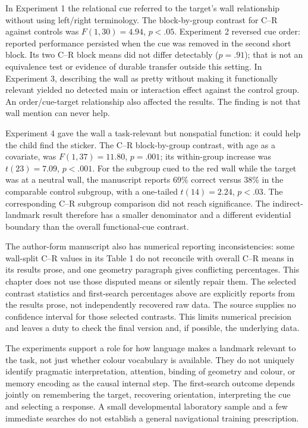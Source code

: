 In Experiment 1 the relational cue referred to the target's wall
relationship without using left/right terminology.
The block-by-group contrast for C--R against controls was
\(F(1,30)=4.94\), \(p<.05\).
Experiment 2 reversed cue order: reported performance persisted
when the cue was removed in the second short block.
Its two C--R block means did not differ detectably (\(p=.91\));
that is not an equivalence test or evidence of durable transfer
outside this setting.
In Experiment 3, describing the wall as pretty without making
it functionally relevant yielded no detected main or interaction
effect against the control group. An order/cue-target relationship
also affected the results. The finding is not that wall mention
can never help.

Experiment 4 gave the wall a task-relevant but nonspatial function:
it could help the child find the sticker.
The C--R block-by-group contrast, with age as a covariate, was
\(F(1,37)=11.80\), \(p=.001\); its within-group increase was
\(t(23)=7.09\), \(p<.001\).
For the subgroup cued to the red wall while the target was at a
neutral wall, the manuscript reports 69\% correct versus 38\%
in the comparable control subgroup, with a one-tailed
\(t(14)=2.24\), \(p<.03\).
The corresponding C--R subgroup comparison did not reach
significance. The indirect-landmark result therefore has a
smaller denominator and a different evidential boundary than
the overall functional-cue contrast.

The author-form manuscript also has numerical reporting
inconsistencies: some wall-split C--R values in its Table 1 do
not reconcile with overall C--R means in its results prose,
and one geometry paragraph gives conflicting percentages.
This chapter does not use those disputed means or silently
repair them. The selected contrast statistics and first-search
percentages above are explicitly reports from the results prose,
not independently recovered raw data.
The source supplies no confidence interval for those selected
contrasts. This limits numerical precision and leaves a duty to
check the final version and, if possible, the underlying data.

The experiments support a role for how language makes a landmark
relevant to the task, not just whether colour vocabulary is
available. They do not uniquely identify pragmatic interpretation,
attention, binding of geometry and colour, or memory encoding
as the causal internal step.
The first-search outcome depends jointly on remembering the target,
recovering orientation, interpreting the cue and selecting a
response. A small developmental laboratory sample and a
few immediate searches do not establish a general navigational
training prescription.

